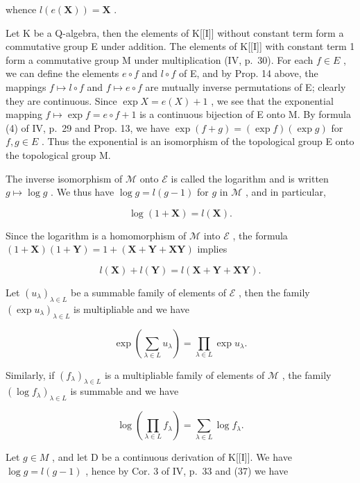 whence \(l(e(\mathbf{X})) = \mathbf{X}\) .

Let K be a Q-algebra, then the elements of K{[}{[}I{]}{]} without constant term form a commutative group E under addition. The elements of K{[}{[}I{]}{]} with constant term 1 form a commutative group M under multiplication (IV, p.~30). For each \(f \in E\) , we can define the elements \(e \circ f\) and \(l \circ f\) of E, and by Prop. 14 above, the mappings \(f \mapsto l \circ f\) and \(f \mapsto e \circ f\) are mutually inverse permutations of E; clearly they are continuous. Since \(\exp X = e(X) + 1\) , we see that the exponential mapping \(f \mapsto \exp f = e \circ f + 1\) is a continuous bijection of E onto M. By formula (4) of IV, p.~29 and Prop. 13, we have \(\exp(f + g) = (\exp f)(\exp g)\) for \(f, g \in E\) . Thus the exponential is an isomorphism of the topological group E onto the topological group M.

The inverse isomorphism of \(\mathcal{M}\) onto \(\mathcal{E}\) is called the logarithm and is written \(g \mapsto \log g\) . We thus have \(\log g = l(g - 1)\) for \(g\) in \(\mathcal{M}\) , and in particular,

\[
\log (1 + \mathbf {X}) = l (\mathbf {X}).\tag{38}
\]

Since the logarithm is a homomorphism of \(\mathcal{M}\) into \(\mathcal{E}\) , the formula \((1 + \mathbf{X})(1 + \mathbf{Y}) = 1 + (\mathbf{X} + \mathbf{Y} + \mathbf{X}\mathbf{Y})\) implies

\[
l (\mathbf {X}) + l (\mathbf {Y}) = l (\mathbf {X} + \mathbf {Y} + \mathbf {X Y}).\tag{39}
\]

Let \((u_{\lambda})_{\lambda \in L}\) be a summable family of elements of \(\mathcal{E}\) , then the family \((\exp u_{\lambda})_{\lambda \in L}\) is multipliable and we have

\[
\exp \left(\sum_ {\lambda \in L} u _ {\lambda}\right) = \prod_ {\lambda \in L} \exp u _ {\lambda}.\tag{40}
\]

Similarly, if \((f_{\lambda})_{\lambda \in L}\) is a multipliable family of elements of \(\mathcal{M}\) , the family \((\log f_{\lambda})_{\lambda \in L}\) is summable and we have

\[
\log \left(\prod_ {\lambda \in L} f _ {\lambda}\right) = \sum_ {\lambda \in L} \log f _ {\lambda}.\tag{41}
\]

Let \(g \in M\) , and let D be a continuous derivation of K{[}{[}I{]}{]}. We have \(\log g = l(g - 1)\) , hence by Cor. 3 of IV, p.~33 and (37) we have

